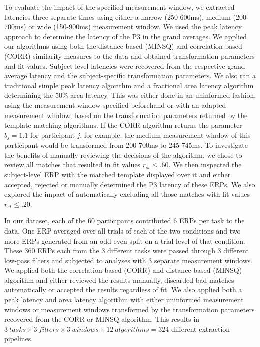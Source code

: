 \documentclass[
  man,floatsintext]{apa7}
\begin{document}
To evaluate the impact of the specified measurement window, we extracted latencies three separate times using either a narrow (250-600ms), medium (200-700ms) or wide (150-900ms) measurement window. We used the peak latency approach to determine the latency of the P3 in the grand averages. We applied our algorithms using both the distance-based (MINSQ) and correlation-based (CORR) similarity measures to the data and obtained transformation parameters and fit values. Subject-level latencies were recovered from the respective grand average latency and the subject-specific transformation parameters.
We also ran a traditional simple peak latency algorithm and a fractional area latency algorithm determining the 50\% area latency. This was either done in an uninformed fashion, using the measurement window specified beforehand or with an adapted measurement window, based on the transformation parameters returned by the template matching algorithms. If the CORR algorithm returns the parameter \(b_j = 1.1\) for participant \(j\), for example, the medium measurement window of this participant would be transformed from 200-700ms to 245-745ms.
To investigate the benefits of manually reviewing the decisions of the algorithm, we chose to review all matches that resulted in fit values \(r_{st} \le .60\). We then inspected the subject-level ERP with the matched template displayed over it and either accepted, rejected or manually determined the P3 latency of these ERPs.
We also explored the impact of automatically excluding all those matches with fit values \(r_{st} \le .20\).

In our dataset, each of the 60 participants contributed 6 ERPs per task to the data. One ERP averaged over all trials of each of the two conditions and two more ERPs generated from an odd-even split on a trial level of that condition. These 360 ERPs each from the 3 different tasks were passed through 3 different low-pass filters and subjected to analyses with 3 separate measurement windows. We applied both the correlation-based (CORR) and distance-based (MINSQ) algorithm and either reviewed the results manually, discarded bad matches automatically or accepted the results regardless of fit. We also applied both a peak latency and area latency algorithm with either uninformed measurement windows or measurement windows transformed by the transformation parameters recovered from the CORR or MINSQ algorithm. This results in \(3 \ tasks \times 3 \ filters \times 3 \ windows \times 12 \ algorithms = 324\) different extraction pipelines.
\end{document}
